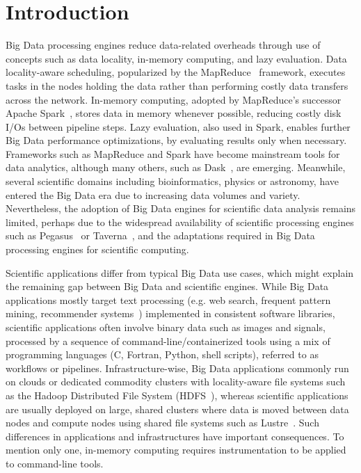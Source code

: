 \documentclass{IEEEtran}
\begin{document}

\section{Introduction} %

Big Data processing engines reduce data-related overheads through 
use of concepts such as data locality, in-memory computing, and lazy evaluation.
Data locality-aware scheduling, popularized by the MapReduce~\cite{dean2008mapreduce} 
framework, executes tasks in the nodes holding the data rather than 
performing costly data transfers across the network. In-memory 
computing, adopted by MapReduce's successor Apache 
Spark~\cite{zaharia2016apache}, stores data in memory whenever 
possible, reducing costly disk I/Os between pipeline steps. 
Lazy evaluation, also used in Spark, enables further Big Data performance 
optimizations, by evaluating results only when necessary. Frameworks 
such as
MapReduce and Spark have become mainstream tools for data analytics, 
although many others, such as 
Dask~\cite{rocklin2015dask}, are emerging. 
Meanwhile, several scientific 
domains including bioinformatics, physics or astronomy, have entered 
the Big Data era due to increasing data volumes and variety. 
Nevertheless, the adoption of Big Data engines for scientific data analysis 
remains limited, perhaps due to the widespread availability of 
scientific processing engines such as Pegasus~\cite{deelman2005pegasus} or
Taverna~\cite{oinn2004taverna}, and the adaptations required in Big 
Data processing engines for scientific computing. 

Scientific applications differ from typical Big Data use 
cases, which might explain the remaining gap between Big Data and 
scientific engines. While Big Data applications mostly target text 
processing (e.g. web search, frequent pattern mining, recommender 
systems~\cite{leskovec2014mining}) implemented in consistent software 
libraries, scientific applications often involve 
binary data such as images and signals, processed by a sequence of 
command-line/containerized tools
using a mix of programming languages (C, Fortran, Python, shell 
scripts), referred to as workflows or pipelines. Infrastructure-wise, 
Big Data applications commonly run on 
clouds or dedicated commodity clusters with locality-aware file systems 
such as the Hadoop Distributed File System 
(HDFS~\cite{shvachko2010hadoop}), whereas scientific applications are 
usually deployed on large, shared clusters where data is moved between
data nodes and compute nodes using shared file systems such 
as Lustre~\cite{schwan2003lustre}. Such differences in applications and 
infrastructures have important consequences. To 
mention only one, in-memory computing requires instrumentation to be 
applied to command-line tools. 
\end{document}
